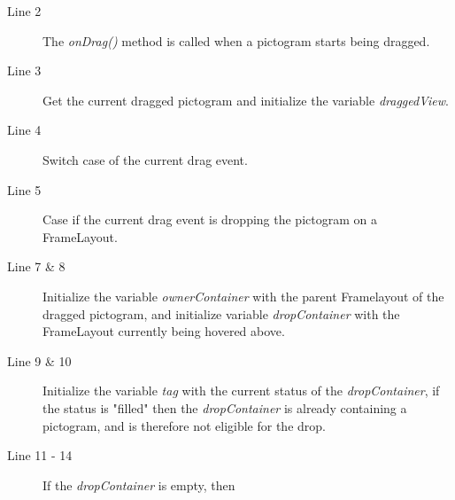 \begin{description}
\item[Line 2] The \textit{onDrag()} method is called when a pictogram starts being dragged.
\item[Line 3] Get the current dragged pictogram and initialize the variable \textit{draggedView}.
\item[Line 4] Switch case of the current drag event.
\item[Line 5] Case if the current drag event is dropping the pictogram on a FrameLayout.
\item[Line 7 \& 8] Initialize the variable \textit{ownerContainer} with the parent Framelayout of the dragged pictogram, and initialize variable \textit{dropContainer} with the FrameLayout currently being hovered above.  
\item[Line 9 \& 10] Initialize the variable \textit{tag} with the current status of the \textit{dropContainer}, if the status is "filled" then the \textit{dropContainer} is already containing a pictogram, and is therefore not eligible for the drop.
\item[Line 11 - 14] If the \textit{dropContainer} is empty, then 
\end{description}
